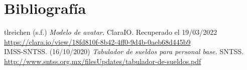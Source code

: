 \documentclass[12pt]{article} %
\begin{document}
	\section{Bibliografía}
	
	tlreichen (s.f.) \emph{Modelo de avatar.} ClaraIO. Recuperado el 19/03/2022
	\color{blue}\url{https://clara.io/view/18fd810f-8b42-4ff0-9d4b-0aeb68d445b9}\color{black}
	\\
	
	IMSS-SNTSS. (16/10/2020) \emph{Tabulador de sueldos para personal base.} SNTSS. 
	\color{blue}\url{http://www.sntss.org.mx/filesUpdates/tabulador-de-sueldos.pdf}\color{black}
	
\end{document}
